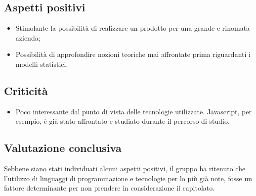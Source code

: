 \subsection{Aspetti positivi}
\begin{itemize}
	\item Stimolante la possibilità di realizzare un prodotto per una grande e rinomata azienda;
	\item Possibilità di approfondire nozioni teoriche mai affrontate prima riguardanti i modelli statistici.
\end{itemize}

\subsection{Criticità}
\begin{itemize}
	\item Poco interessante dal punto di vista delle tecnologie utilizzate. Javascript, per esempio, è già stato affrontato e studiato durante il percorso di studio.
\end{itemize}

\subsection{Valutazione conclusiva}
Sebbene siano stati individuati alcuni aspetti positivi, il gruppo ha ritenuto che l'utilizzo di linguaggi di programmazione e tecnologie per lo più già note, fosse un fattore determinante per non prendere in considerazione il capitolato\glo.